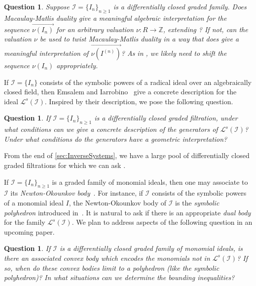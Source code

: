\documentclass[12pt, reqno]{amsart}
\numberwithin{equation}{section}
\newcommand{\Z}{{\mathbb Z}}
\newcommand{\cI}{{\mathcal I}}
\newcommand{\cL}{{\mathcal L}}
\newcommand{\I}{{\mathcal I}}
\theoremstyle{plain} %
\newtheorem{question}[thm]{Question}
\theoremstyle{definition}
\theoremstyle{remark}
\begin{document}
\begin{question}
Suppose $\I=\{I_n\}_{n\ge 1}$ is a differentially closed graded family.  Does Macaulay-Matlis duality give a meaningful algebraic interpretation for the sequence $\overrightarrow{\nu(I_n)}$ for an arbitrary valuation $\nu:R\to\Z$, extending ?  If not, can the valuation $\nu$ be used to \textit{twist} Macaulay-Matlis duality in a way that does give a meaningful interpretation of $\overrightarrow{\nu(I^{(n)})}$?  As in , we likely need to shift the sequence $\nu(I_n)$ appropriately.
\end{question}

If $\I=\{I_n\}$ consists of the symbolic powers of a radical ideal over an algebraically closed field, then Emsalem and Iarrobino~\cite{EI95} give a concrete description for the ideal $\cL^s(\I)$.  Inspired by their description, we pose the following question.

\begin{question}\label{ques:DualGens}
If $\I=\{I_n\}_{n\ge 1}$ is a differentially closed graded filtration, under what conditions can we give a concrete description of the generators of $\cL^s(\I)$?  Under what conditions do the generators have a geometric interpretation?
\end{question}

From the end of \cref{sec:InverseSystems}, we have a large pool of differentially closed graded filtrations for which we can ask .

If $\I=\{I_n\}_{n\ge 1}$ is a graded family of monomial ideals, then one may associate to $\I$ its \textit{Newton-Okounkov body}~\cite{Ha-Nguyen-Okounkov}.  For instance, if $\I$ consists of the symbolic powers of a monomial ideal $I$, the Newton-Okounkov body of $\cI$ is the \textit{symbolic polyhedron} introduced in~\cite{CEHH}.  It is natural to ask if there is an appropriate \textit{dual body} for the family $\cL^s(\I)$.  We plan to address aspects of the following question in an upcoming paper.

\begin{question}
If $\I$ is a differentially closed graded family of monomial ideals, is there an associated convex body which encodes the monomials not in $\cL^s(\I)$?  If so, when do these convex bodies limit to a polyhedron (like the symbolic polyhedron)?  In what situations can we determine the bounding inequalities?
\end{question}
\end{document}
